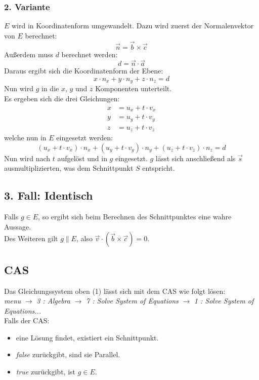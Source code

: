 \documentclass[a4paper,12pt]{article}
\begin{document}
\subsubsection*{2. Variante}
$E$ wird in Koordinatenform umgewandelt. Dazu wird zuerst der Normalenvektor von $E$ berechnet:
$$\vec{n} = \vec{b} \times \vec{c}$$
Außerdem muss $d$ berechnet werden:
$$d = \vec{n} \cdot \vec{a}$$
Daraus ergibt sich die Koordinatenform der Ebene:
$$x \cdot n_x + y \cdot n_y + z \cdot n_z = d$$
Nun wird $g$ in die $x$, $y$ und $z$ Komponenten unterteilt.\\
Es ergeben sich die drei Gleichungen:
\begin{equation*}
\begin{split}
x & = u_x + t \cdot v_x\\
y & = u_y + t \cdot v_y\\
z & = u_z + t \cdot v_z
\end{split}
\end{equation*}
welche nun in $E$ eingesetzt werden:
$$(u_x + t \cdot v_x) \cdot n_x + (u_y + t \cdot v_y) \cdot n_y + (u_z + t \cdot v_z) \cdot n_z = d$$
Nun wird nach $t$ aufgelöst und in $g$ eingesetzt. $g$ lässt sich anschließend als $\vec{s}$ ausmultiplizierten, was dem Schnittpunkt $S$ entspricht.
\subsection{3. Fall: Identisch}
Falls $g \in E$, so ergibt sich beim Berechnen des Schnittpunktes eine wahre Aussage.\\
Des Weiteren gilt $g \parallel E$, also $\vec{v} \cdot (\vec{b} \times \vec{c}) = 0$.
\subsection{CAS}
Das Gleichungssystem oben (1) lässt sich mit dem CAS wie folgt lösen:\\
\textit{menu} $\rightarrow$ \textit{3 : Algebra} $\rightarrow$ \textit{7 : Solve System of Equations} $\rightarrow$ \textit{1 : Solve System of Equations...}\\
Falls der CAS:
\begin{itemize}
\item eine Lösung findet, existiert ein Schnittpunkt.
\item \textit{false} zurückgibt, sind sie Parallel.
\item \textit{true} zurückgibt, ist $g \in E$.
\end{itemize}
\end{document}
